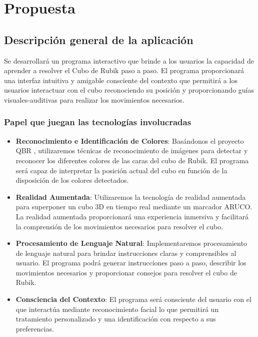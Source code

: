 \chapter{Propuesta}

\section{Descripción general de la aplicación}

Se desarrollará un programa interactivo que brinde a los usuarios la capacidad
de aprender a resolver el Cubo de Rubik paso a paso. El programa proporcionará
una interfaz intuitiva y amigable consciente del contexto que permitirá a los
usuarios interactuar con el cubo reconociendo su posición y proporcionando guías
visuales-auditivas para realizar los movimientos necesarios.

\subsection{Papel que juegan las tecnologías involucradas}

\begin{itemize}
\item{\textbf{Reconocimiento e Identificación de Colores}: Basándonos el proyecto QBR \cite{QBR},
utilizaremos técnicas de reconocimiento de imágenes para detectar y reconocer
los diferentes colores de las caras del cubo de Rubik. El programa será capaz de
interpretar la posición actual del cubo en función de la disposición de los
colores detectados.}

\item{ \textbf{Realidad Aumentada}: Utilizaremos la tecnología de realidad aumentada para
superponer un cubo 3D en tiempo real mediante un marcador ARUCO. La realidad
aumentada proporcionará una experiencia inmersiva y facilitará la comprensión de
los movimientos necesarios para resolver el cubo.}

\item{ \textbf{Procesamiento de Lenguaje Natural}: Implementaremos procesamiento de lenguaje
natural para brindar instrucciones claras y comprensibles al usuario. El
programa podrá generar instrucciones paso a paso, describir los movimientos
necesarios y proporcionar consejos para resolver el cubo de Rubik.}


\item{ \textbf{Consciencia del Contexto}: El programa será consciente del usuario con el que
interactúa mediante reconocimiento facial lo que permitirá un tratamiento
personalizado y una identificación con respecto a sus preferencias.}

\end{itemize}